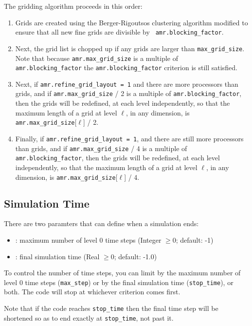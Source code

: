The gridding algorithm proceeds in this order:
\begin{enumerate}
\item Grids are created using the Berger-Rigoutsos clustering algorithm 
modified to ensure that all new fine grids are divisible by {\tt
amr.blocking\_factor}.

\item Next, the grid list is chopped up if any grids are larger than {\tt max\_grid\_size}.
Note that because {\tt amr.max\_grid\_size} is a multiple of {\tt
amr.blocking\_factor} the {\tt amr.blocking\_factor} criterion is
still satisfied.

\item Next, if {\tt amr.refine\_grid\_layout = 1} and there are more processors than grids, and
if {\tt amr.max\_grid\_size} / 2 is a multiple of {\tt amr.blocking\_factor},
then the grids will be redefined, at each level independently, so that
the maximum length of a grid at level $\ell$, in any dimension, is
{\tt amr.max\_grid\_size}[$\ell$] / 2.

\item Finally, if {\tt amr.refine\_grid\_layout = 1},  and there are still more processors
than grids, and if {\tt amr.max\_grid\_size} / 4 is a multiple of {\tt
amr.blocking\_factor}, then the grids will be redefined, at each level
independently, so that the maximum length of a grid at level $\ell$,
in any dimension, is {\tt amr.max\_grid\_size}[$\ell$] / 4.
\end{enumerate}


\subsection{Simulation Time}

There are two paramters that can define when a simulation ends:
\begin{itemize}
\item {}: maximum number of level 0 time steps (Integer
  $\geq 0$; default: -1)
\item {}: final simulation time (Real $\geq 0$; default:
  -1.0)
\end{itemize}
To control the number of time steps, you can limit by the maximum
number of level 0 time steps ({\tt max\_step}) or by the final
simulation time ({\tt stop\_time}), or both. The code will stop at
whichever criterion comes first.

Note that if the code reaches {\tt stop\_time} then the final time
step will be shortened so as to end exactly at {\tt stop\_time}, not
past it.

